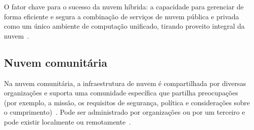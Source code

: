 O fator chave para o sucesso da nuvem híbrida: a capacidade para gerenciar de
forma eficiente e segura a combinação de serviços de nuvem pública e privada
como um único ambiente de computação unificado, tirando proveito integral da
nuvem~\cite{ibm-what-is-cloud-computing}.

\subsection{Nuvem comunitária}

Na nuvem comunitária, a infraestrutura de nuvem é compartilhada por diversas 
organizações e suporta uma comunidade específica que partilha preocupações (por 
exemplo, a missão, os requisitos de segurança, política e considerações sobre o 
cumprimento)~\cite{brown2014seguranca}. Pode ser administrado por organizações ou 
por um terceiro e pode existir localmente ou remotamente~\cite{brown2014seguranca}.

